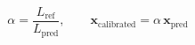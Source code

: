 \documentclass[12pt]{article}
\begin{document}
\begin{equation*}
\alpha = \frac{L_{\text{ref}}}{L_{\text{pred}}}, \qquad \mathbf{x}_{\text{calibrated}} = \alpha\, \mathbf{x}_{\text{pred}}
\end{equation*}
\end{document}
